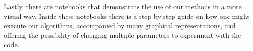 Lastly, there are  notebooks that demonstrate the use of our methods in a more visual way. Inside these notebooks there is a step-by-step guide on how one might execute our algorithms, accompanied by many graphical representations, and offering the possibility of changing multiple parameters to experiment with the code.

